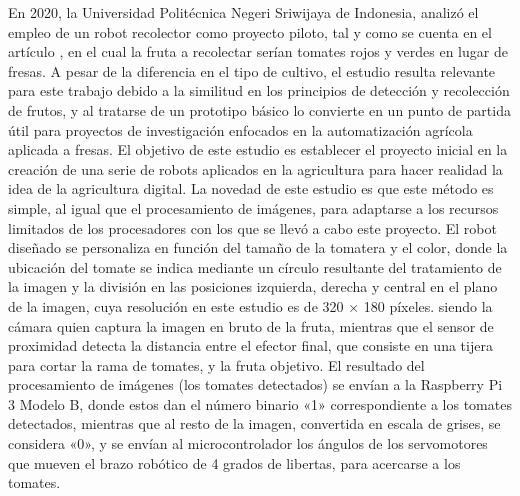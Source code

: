 En 2020, la Universidad Politécnica Negeri Sriwijaya de Indonesia, analizó el empleo de un robot recolector como proyecto piloto, tal y como se cuenta en el artículo \cite{Oktarina20}, en el cual la fruta a recolectar serían tomates rojos y verdes en lugar de fresas. A pesar de la diferencia en el tipo de cultivo, el estudio resulta relevante para este trabajo debido a la similitud en los principios de detección y recolección de frutos, y al tratarse de un prototipo básico lo convierte en un punto de partida útil para proyectos de investigación enfocados en la automatización agrícola aplicada a fresas. El objetivo de este estudio es establecer el proyecto inicial en la creación de una serie de robots aplicados en la agricultura para hacer realidad la idea de la agricultura digital. La novedad de este estudio es que este método es simple, al igual que el procesamiento de imágenes, para adaptarse a los recursos limitados de los procesadores con los que se llevó a cabo este proyecto. El robot diseñado se personaliza en función del tamaño de la tomatera y el color, donde la ubicación del tomate se indica mediante un círculo resultante del tratamiento de la imagen y la división en las posiciones izquierda, derecha y central en el plano de la imagen, cuya resolución en este estudio es de 320 × 180 píxeles.%
siendo la cámara quien captura la imagen en bruto de la fruta, mientras que el sensor de proximidad detecta la distancia entre el efector final, que consiste en una tijera para cortar la rama de tomates, y la fruta objetivo. %
El resultado del procesamiento de imágenes (los tomates detectados) se envían a la Raspberry Pi 3 Modelo B, donde estos dan el número binario «1» correspondiente a los tomates detectados, mientras que al resto de la imagen, convertida en escala de grises, se considera «0», y se envían al microcontrolador los ángulos de los servomotores que mueven el brazo robótico de 4 grados de libertas, para acercarse a los tomates. %

